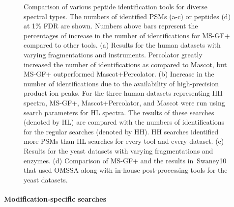 \begin{figure}[tbp]
\begin{center}
\caption{\footnotesize 
Comparison of various peptide identification tools for diverse spectral types. 
The numbers of identified PSMs (a-c) or peptides (d) at 1\% FDR are shown.
Numbers above bars represent the percentages of increase in the number of identifications for MS-GF+ compared to other tools.
(a) Results for the human datasets with varying fragmentations and instruments.
Percolator greatly increased the number of identifications as compared to Mascot, but MS-GF+ outperformed Mascot+Percolator.
(b) Increase in the number of identifications due to the availability of high-precision product ion peaks. 
For the three human datasets representing HH spectra, MS-GF+, Mascot+Percolator, and Mascot were run %
using search parameters for HL spectra.
The results of these searches (denoted by HL) are compared with the numbers of identifications for the regular searches (denoted by HH).
HH searches identified more PSMs than HL searches for every tool and every dataset.
(c) Results for the yeast datasets with varying fragmentations and enzymes. 
(d) Comparison of MS-GF+ and the results in~\cite{unv}{Swaney10} that used OMSSA along with in-house post-processing tools
for the yeast datasets.
}
\label{Comp_Public}
\end{center}
\end{figure}

\paragraph{Modification-specific searches} 

